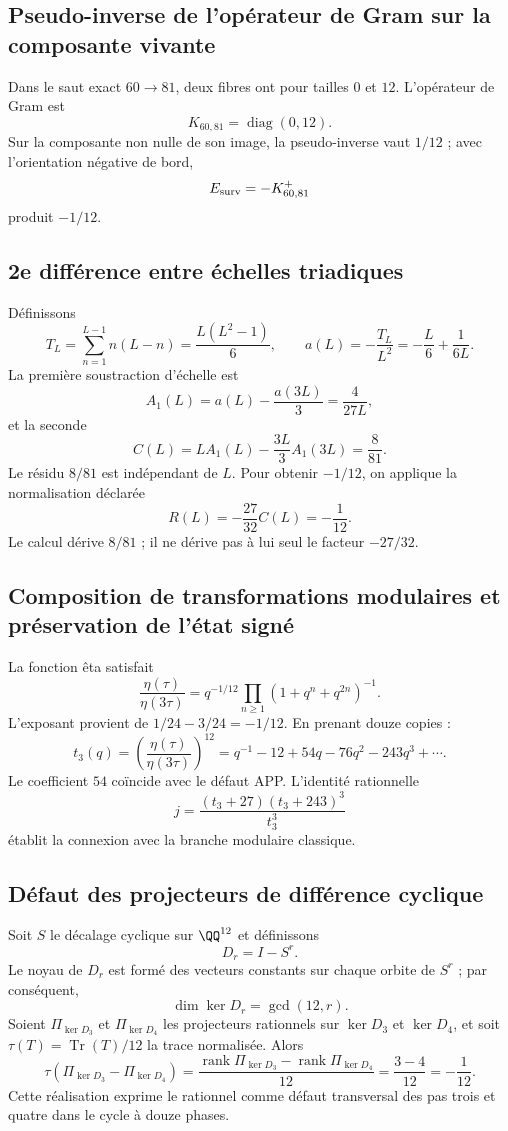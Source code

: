 \subsection{Pseudo-inverse de l’opérateur de Gram sur la composante vivante}

Dans le saut exact \(60\to81\), deux fibres ont pour tailles \(0\) et
\(12\). L’opérateur de Gram est
\[
K_{60,81}=\operatorname{diag}(0,12).
\]
Sur la composante non nulle de son image, la pseudo-inverse vaut \(1/12\) ; avec l’orientation
négative de bord,
\[
E_{\rm surv}=-K_{60,81}^{+}
\]
produit \(-1/12\).

\subsection{2e différence entre échelles triadiques}

Définissons
\[
T_L=\sum_{n=1}^{L-1}n(L-n)=\frac{L(L^2-1)}6,
\qquad
a(L)=-\frac{T_L}{L^2}=-\frac L6+\frac1{6L}.
\]
La première soustraction d’échelle est
\[
A_1(L)=a(L)-\frac{a(3L)}3=\frac4{27L},
\]
et la seconde
\[
C(L)=LA_1(L)-\frac{3L}{3}A_1(3L)=\frac8{81}.
\]
Le résidu \(8/81\) est indépendant de \(L\). Pour obtenir
\(-1/12\), on applique la normalisation déclarée
\[
R(L)=-\frac{27}{32}C(L)=-\frac1{12}.
\]
Le calcul dérive \(8/81\) ; il ne dérive pas à lui seul le facteur \(-27/32\).

\subsection{Composition de transformations modulaires et préservation de l'état signé}

La fonction êta satisfait
\[
\frac{\eta(\tau)}{\eta(3\tau)}
=q^{-1/12}\prod_{n\ge1}(1+q^n+q^{2n})^{-1}.
\]
L’exposant provient de \(1/24-3/24=-1/12\). En prenant douze copies :
\[
t_3(q)=\left(\frac{\eta(\tau)}{\eta(3\tau)}\right)^{12}
=q^{-1}-12+54q-76q^2-243q^3+\cdots.
\]
Le coefficient \(54\) coïncide avec le défaut APP\@. L’identité rationnelle
\[
j=\frac{(t_3+27)(t_3+243)^3}{t_3^3}
\]
établit la connexion avec la branche modulaire classique.

\subsection{Défaut des projecteurs de différence cyclique}

Soit \(S\) le décalage cyclique sur \(\QQ^{12}\) et définissons
\[
 D_r=I-S^r.
\]
Le noyau de \(D_r\) est formé des vecteurs constants sur chaque orbite
de \(S^r\) ; par conséquent,
\[
 \dim\ker D_r=\gcd(12,r).
\]
Soient \(\Pi_{\ker D_3}\) et \(\Pi_{\ker D_4}\) les projecteurs rationnels sur
\(\ker D_3\) et \(\ker D_4\), et soit
\(\tau(T)=\operatorname{Tr}(T)/12\) la trace normalisée. Alors
\[
 \boxed{
 \tau(\Pi_{\ker D_3}-\Pi_{\ker D_4})
 =\frac{\operatorname{rank}\Pi_{\ker D_3}
       -\operatorname{rank}\Pi_{\ker D_4}}{12}
 =\frac{3-4}{12}
 =-\frac1{12}.}
\]
Cette réalisation exprime le rationnel comme défaut transversal des pas
trois et quatre dans le cycle à douze phases.

